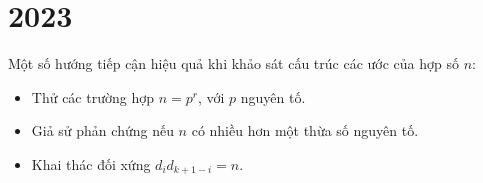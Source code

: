 \documentclass[./m.tex]{subfiles}
\begin{document}
\section{2023}

\begin{hint*}
    Một số hướng tiếp cận hiệu quả khi khảo sát cấu trúc các ước của hợp số \( n \):
    \begin{itemize}[topsep=0pt, itemsep=0pt]
        \item Thử các trường hợp \( n = p^r \), với \( p \) nguyên tố.
        \item Giả sử phản chứng nếu \( n \) có nhiều hơn một thừa số nguyên tố.
        \item Khai thác đối xứng \( d_i d_{k+1-i} = n \).
    \end{itemize}
\end{hint*}
\end{document}
